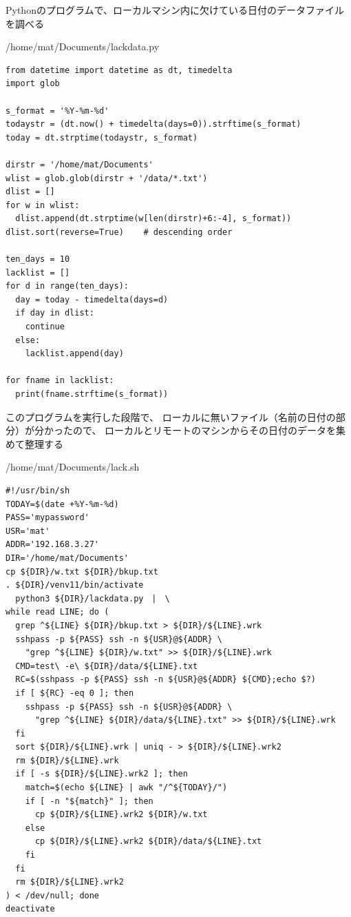 \documentclass[12pt,a4j]{jsbook}
\begin{document}
Pythonのプログラムで、ローカルマシン内に欠けている日付のデータファイルを調べる

\begin{spacing}{0.95}
\begin{itembox}[l]{/home/mat/Documents/lackdata.py}
\begin{verbatim}
from datetime import datetime as dt, timedelta
import glob

s_format = '%Y-%m-%d'
todaystr = (dt.now() + timedelta(days=0)).strftime(s_format)
today = dt.strptime(todaystr, s_format)

dirstr = '/home/mat/Documents'
wlist = glob.glob(dirstr + '/data/*.txt')
dlist = []
for w in wlist:
  dlist.append(dt.strptime(w[len(dirstr)+6:-4], s_format))
dlist.sort(reverse=True)	# descending order

ten_days = 10
lacklist = []
for d in range(ten_days):
  day = today - timedelta(days=d)
  if day in dlist:
    continue
  else:
    lacklist.append(day)

for fname in lacklist:
  print(fname.strftime(s_format))
\end{verbatim}
\end{itembox}
\end{spacing}

このプログラムを実行した段階で、
ローカルに無いファイル（名前の日付の部分）が分かったので、
ローカルとリモートのマシンからその日付のデータを集めて整理する
\begin{spacing}{0.95}
\begin{itembox}[l]{/home/mat/Documents/lack.sh}
\begin{verbatim}
#!/usr/bin/sh
TODAY=$(date +%Y-%m-%d)
PASS='mypassword'
USR='mat'
ADDR='192.168.3.27'
DIR='/home/mat/Documents'
cp ${DIR}/w.txt ${DIR}/bkup.txt
. ${DIR}/venv11/bin/activate
  python3 ${DIR}/lackdata.py　|　\
while read LINE; do (
  grep ^${LINE} ${DIR}/bkup.txt > ${DIR}/${LINE}.wrk
  sshpass -p ${PASS} ssh -n ${USR}@${ADDR} \
    "grep ^${LINE} ${DIR}/w.txt" >> ${DIR}/${LINE}.wrk
  CMD=test\ -e\ ${DIR}/data/${LINE}.txt
  RC=$(sshpass -p ${PASS} ssh -n ${USR}@${ADDR} ${CMD};echo $?)
  if [ ${RC} -eq 0 ]; then
    sshpass -p ${PASS} ssh -n ${USR}@${ADDR} \
      "grep ^${LINE} ${DIR}/data/${LINE}.txt" >> ${DIR}/${LINE}.wrk
  fi
  sort ${DIR}/${LINE}.wrk | uniq - > ${DIR}/${LINE}.wrk2
  rm ${DIR}/${LINE}.wrk
  if [ -s ${DIR}/${LINE}.wrk2 ]; then
    match=$(echo ${LINE} | awk "/^${TODAY}/")
    if [ -n "${match}" ]; then
      cp ${DIR}/${LINE}.wrk2 ${DIR}/w.txt
    else
      cp ${DIR}/${LINE}.wrk2 ${DIR}/data/${LINE}.txt
    fi
  fi
  rm ${DIR}/${LINE}.wrk2
) < /dev/null; done
deactivate
\end{verbatim}
\end{itembox}
\end{spacing}
\end{document}
